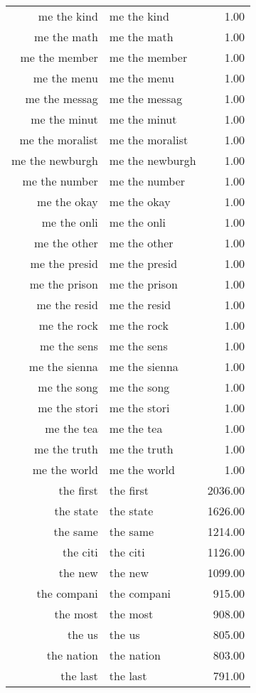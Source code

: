 \begin{table}[ht]
\begin{tabular}{rlr}
  me the kind & me the kind & 1.00 \\ 
  me the math & me the math & 1.00 \\ 
  me the member & me the member & 1.00 \\ 
  me the menu & me the menu & 1.00 \\ 
  me the messag & me the messag & 1.00 \\ 
  me the minut & me the minut & 1.00 \\ 
  me the moralist & me the moralist & 1.00 \\ 
  me the newburgh & me the newburgh & 1.00 \\ 
  me the number & me the number & 1.00 \\ 
  me the okay & me the okay & 1.00 \\ 
  me the onli & me the onli & 1.00 \\ 
  me the other & me the other & 1.00 \\ 
  me the presid & me the presid & 1.00 \\ 
  me the prison & me the prison & 1.00 \\ 
  me the resid & me the resid & 1.00 \\ 
  me the rock & me the rock & 1.00 \\ 
  me the sens & me the sens & 1.00 \\ 
  me the sienna & me the sienna & 1.00 \\ 
  me the song & me the song & 1.00 \\ 
  me the stori & me the stori & 1.00 \\ 
  me the tea & me the tea & 1.00 \\ 
  me the truth & me the truth & 1.00 \\ 
  me the world & me the world & 1.00 \\ 
  the first & the first & 2036.00 \\ 
  the state & the state & 1626.00 \\ 
  the same & the same & 1214.00 \\ 
  the citi & the citi & 1126.00 \\ 
  the new & the new & 1099.00 \\ 
  the compani & the compani & 915.00 \\ 
  the most & the most & 908.00 \\ 
  the us & the us & 805.00 \\ 
  the nation & the nation & 803.00 \\ 
  the last & the last & 791.00 \\ 

\end{tabular}
\end{table}
